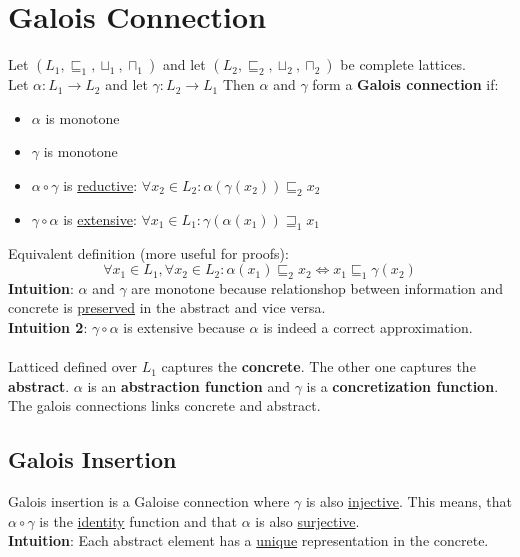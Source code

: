 \section{Galois Connection}
Let $(L_1,\sqsubseteq_1,\sqcup_1,\sqcap_1)$ and let $(L_2,\sqsubseteq_2,\sqcup_2,\sqcap_2)$ be complete lattices. \\
Let $\alpha: L_1 \to L_2$ and let $\gamma: L_2 \to L_1$
Then $\alpha$ and $\gamma$ form a \textbf{Galois connection} if:
\begin{itemize}
\item $\alpha$ is monotone
\item $\gamma$ is monotone
\item $\alpha \circ \gamma$ is \underline{reductive}: $\forall x_2 \in L_2: \alpha(\gamma(x_2)) \sqsubseteq_2 x_2$
\item $\gamma \circ \alpha$ is \underline{extensive}: $\forall x_1 \in L_1: \gamma(\alpha(x_1)) \sqsupseteq_1 x_1$
\end{itemize}
Equivalent definition (more useful for proofs):
\begin{equation}
\label{eq:galois}
\forall x_1 \in L_1, \forall x_2 \in L_2: \alpha(x_1) \sqsubseteq_2 x_2 \iff x_1 \sqsubseteq_1 \gamma(x_2)
\end{equation}
\textbf{Intuition}: $\alpha$ and $\gamma$ are monotone because relationshop between information and concrete is \underline{preserved} in the abstract and vice versa. \\
\textbf{Intuition 2}: $\gamma \circ \alpha$ is extensive because $\alpha$ is indeed a correct approximation. \\ \\
Latticed defined over $L_1$ captures the \textbf{concrete}. The other one captures the \textbf{abstract}. $\alpha$ is an \textbf{abstraction function} and $\gamma$ is a \textbf{concretization function}. The galois connections links concrete and abstract.
\subsection{Galois Insertion}
Galois insertion is a Galoise connection where $\gamma$ is also \underline{injective}. This means, that $\alpha \circ \gamma$ is the \underline{identity} function and that $\alpha$ is also \underline{surjective}.\\
\textbf{Intuition}: Each abstract element has a \underline{unique} representation in the concrete.
